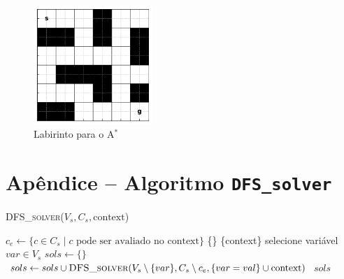 \documentclass[12pt]{article}
\begin{document}
\begin{enumerate}
    \begin{figure}[h]
    \centering
    \includegraphics[width=0.4\textwidth]{labirinto.png}
    \caption{Labirinto para o A$^*$}
    \end{figure}

\end{enumerate}


\section*{Apêndice – Algoritmo \texttt{DFS\_solver}}

\begin{algorithm}[H]
\caption{\textsc{DFS\_solver}(\( V_s, C_s, \text{context} \))}
\begin{algorithmic}[1]
\State \( c_e \gets \{c \in C_s \mid c \text{ pode ser avaliado no } \text{context} \} \)
    \State \Return \{\}
    \State \Return \{context\}
\Else
    \State selecione variável \( var \in V_s \)
    \State \( sols \gets \{\} \)
        \State \( sols \gets sols \cup \textsc{DFS\_solver}(V_s \setminus \{var\}, C_s \setminus c_e, \{var = val\} \cup \text{context}) \)
    \EndFor
    \State \Return \( sols \)
\EndIf
\end{algorithmic}
\end{algorithm}
\end{document}
